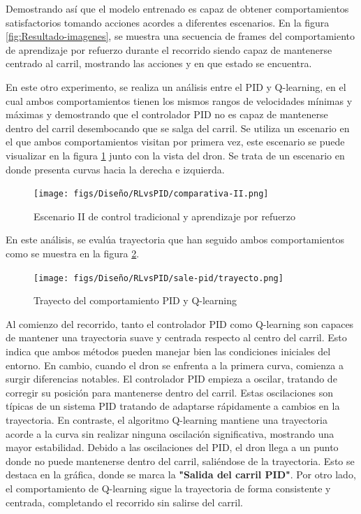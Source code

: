 Demostrando así que el modelo entrenado es capaz de obtener comportamientos satisfactorios tomando acciones acordes a diferentes escenarios. En la figura \ref{fig:Resultado-imagenes}, 
se muestra una secuencia de frames
del comportamiento de aprendizaje por refuerzo durante el recorrido siendo capaz de mantenerse centrado al carril, mostrando las acciones y en que estado se encuentra.

En este otro experimento, se realiza un análisis entre el PID y Q-learning, en el cual ambos comportamientos tienen los mismos rangos de velocidades mínimas y máximas y demostrando que
el controlador PID no es capaz de mantenerse dentro del carril desembocando que se salga 
del carril. Se utiliza un escenario en el que ambos comportamientos visitan por primera vez, este escenario se puede visualizar en la figura \ref{fig:escenario-comparativa-II} junto 
con la vista del dron. Se trata de un escenario en donde presenta curvas hacia la derecha e izquierda.

\begin{figure} [H]
  \begin{center}
    \texttt{[image: figs/Diseño/RLvsPID/comparativa-II.png]}
  \end{center}
  \caption{Escenario II de control tradicional y aprendizaje por refuerzo}
  \label{fig:escenario-comparativa-II}
  \vspace{-1.5em}
\end{figure}

En este análisis, se evalúa trayectoria que han seguido ambos comportamientos como se muestra en la figura \ref{fig:Trayecto-II}. 

\begin{figure} [H]
  \begin{center}
    \texttt{[image: figs/Diseño/RLvsPID/sale-pid/trayecto.png]}
  \end{center}
  \caption{Trayecto del comportamiento PID y Q-learning}
  \label{fig:Trayecto-II}
  \vspace{-1.5em}
\end{figure}

Al comienzo del recorrido, tanto el controlador PID como Q-learning
son capaces de mantener una trayectoria suave y centrada respecto al centro del carril. Esto indica que ambos métodos pueden manejar bien las condiciones iniciales del entorno. En cambio, cuando 
el dron se enfrenta a la primera curva, comienza a surgir diferencias notables. El controlador PID empieza a oscilar, tratando de corregir su posición para mantenerse dentro del carril. Estas 
oscilaciones son típicas de un sistema PID tratando de adaptarse rápidamente a cambios en la trayectoria. En contraste, el algoritmo Q-learning mantiene una trayectoria acorde a la curva 
sin realizar ninguna oscilación significativa, mostrando una mayor estabilidad. Debido a las oscilaciones del PID, el dron llega a un punto donde no puede mantenerse dentro del carril, saliéndose 
de la trayectoria. Esto se destaca en la gráfica, donde se marca la \textbf{"Salida del carril PID"}. Por otro lado, el comportamiento de Q-learning sigue la trayectoria  de forma consistente 
y centrada, completando el recorrido sin salirse del carril.

